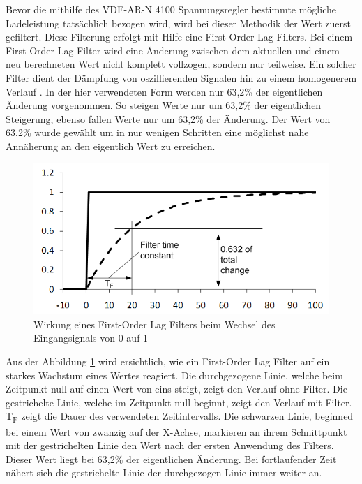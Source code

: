 Bevor die mithilfe des VDE-AR-N 4100 Spannungsregler bestimmte mögliche Ladeleistung tatsächlich bezogen wird, wird bei dieser Methodik der Wert zuerst gefiltert. Diese Filterung erfolgt mit Hilfe eine First-Order Lag Filters. Bei einem First-Order Lag Filter wird eine Änderung zwischen dem aktuellen und einem neu berechneten Wert nicht komplett vollzogen, sondern nur teilweise. Ein solcher Filter dient der Dämpfung von oszillierenden Signalen hin zu einem homogenerem Verlauf . In der hier verwendeten Form werden nur 63,2\% der eigentlichen Änderung vorgenommen. So steigen Werte nur um 63,2\% der eigentlichen Steigerung, ebenso fallen Werte nur um 63,2\% der Änderung. Der Wert von 63,2\% wurde gewählt um in nur wenigen Schritten eine möglichst nahe Annäherung an den eigentlich Wert zu erreichen.
\begin{figure}[htb]
	\includegraphics[scale=0.75]{img/lag_Filter.png}
	\caption{Wirkung eines First-Order Lag Filters beim Wechsel des Eingangsignals von 0 auf 1}
	\label{Abb_lag_filter}
\end{figure}

Aus der Abbildung \ref{Abb_lag_filter} wird ersichtlich, wie ein First-Order Lag Filter auf ein starkes Wachstum eines Wertes reagiert. Die durchgezogene Linie, welche beim Zeitpunkt null auf einen Wert von eins steigt, zeigt den Verlauf ohne Filter. Die gestrichelte Linie, welche im Zeitpunkt null beginnt, zeigt den Verlauf mit Filter. T\textsubscript{F} zeigt die Dauer des verwendeten Zeitintervalls. Die schwarzen Linie, beginned bei einem Wert von zwanzig auf der X-Achse, markieren an ihrem Schnittpunkt  mit der gestrichelten Linie den Wert nach der ersten Anwendung des Filters. Dieser Wert liegt bei 63,2\% der eigentlichen Änderung. Bei fortlaufender Zeit nähert sich die gestrichelte Linie der durchgezogen Linie immer weiter an.

